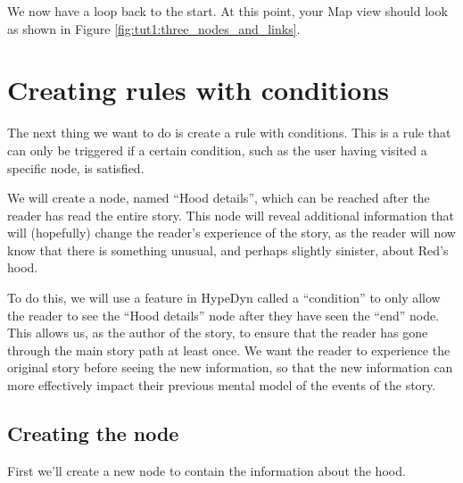 \documentclass{article}
\begin{document}
We now have a loop back to the start. At this point, your Map view should look
as shown in Figure \ref{fig:tut1:three_nodes_and_links}.

\section{Creating rules with conditions}

The next thing we want to do is create a rule with conditions. This is a rule
that can only be triggered if a certain condition, such as the user having
visited a specific node, is satisfied.

We will create a node, named ``Hood details'', which can be reached after the
reader has read the entire story. This node will reveal additional information
that will (hopefully) change the reader's experience of the story, as the reader
will now know that there is something unusual, and perhaps slightly sinister,
about Red's hood.

To do this, we will use a feature in HypeDyn called a ``condition'' to only allow
the reader to see the ``Hood details'' node after they have seen the ``end''
node. This allows us, as the author of the story, to ensure that the reader has
gone through the main story path at least once. We want the reader to experience
the original story before seeing the new information, so that the new information
can more effectively impact their previous mental model of the events of the
story.

\subsection{Creating the node}

First we'll create a new node to contain the information about the hood.
\end{document}
